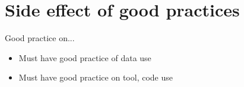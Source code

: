 \section{Side effect of good practices}
\begin{frame}
\begin{block}{Good practice on...}
\begin{itemize}
\item Must have good practice of data use
\item Must have good practice on tool, code use
\end{itemize}
\end{block}


\end{frame}
\begin{frame}
\end{frame}

